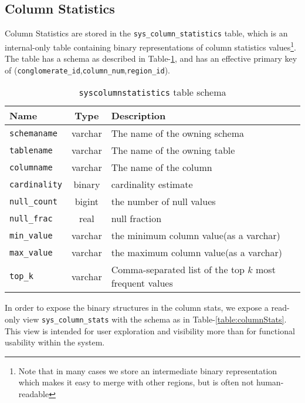 \subsection{Column Statistics}
Column Statistics are stored in the \texttt{sys\_column\_statistics} table, which is an internal-only table containing binary representations of column statistics values\footnote{Note that in many cases we store an intermediate binary representation which makes it easy to merge with other regions, but is often not human-readable}. The table has a schema as described in Table-\ref{table:columnStatistics}, and has an effective primary key of 
\linebreak(\texttt{conglomerate\_id},\texttt{column\_num},\texttt{region\_id}).

\begin{table}
				\begin{tabular}{|l|c|p{6cm}|}
								\hline
								\bf{Name}									& \bf{Type}	&	\bf{Description} \\ \hline	
								\texttt{schemaname}				&	varchar		&	The name of the owning schema \\ \hline
								\texttt{tablename}				&	varchar		&	The name of the owning table \\ \hline
								\texttt{columname}				&	varchar		&	The name of the column \\ \hline
								\texttt{cardinality}			&	binary		&	cardinality estimate \\ \hline
								\texttt{null\_count}			&	bigint		&	the number of null values \\ \hline
								\texttt{null\_frac}				&	real			&	null fraction \\ \hline
								\texttt{min\_value}				&	varchar		&	the minimum column value(as a varchar)	\\	\hline
								\texttt{max\_value}				&	varchar		&	the maximum column value(as a varchar)	\\	\hline
								\texttt{top\_k}						&	varchar		&	Comma-separated list of the top $k$ most frequent values \\ \hline
				\end{tabular}
				\caption{\texttt{syscolumnstatistics} table schema}
				\label{table:columnStatistics}
\end{table}

In order to expose the binary structures in the column stats, we expose a read-only view \linebreak\texttt{sys\_column\_stats} with the schema as in Table-\ref{table:columnStats}. This view is intended for user exploration and visibility more than for functional usability within the system.

